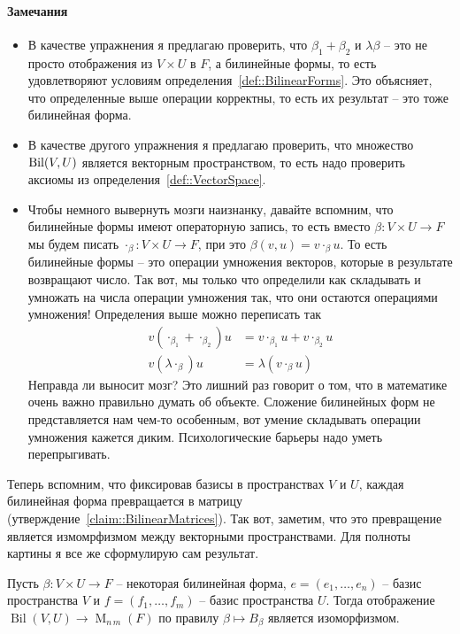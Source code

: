 \paragraph{Замечания}
\begin{itemize}
\item 
В качестве упражнения я предлагаю проверить, что $\beta_1 + \beta_2$ и $\lambda\beta$ -- это не просто отображения из $V\times U$ в $F$, а билинейные формы, то есть удовлетворяют условиям определения~\ref{def::BilinearForms}. Это объясняет, что определенные выше операции корректны, то есть их результат -- это тоже билинейная форма.

\item
В качестве другого упражнения я предлагаю проверить, что множество $\operatorname{Bil}(V, U)$ является векторным пространством, то есть надо проверить аксиомы из определения~\ref{def::VectorSpace}.

\item Чтобы немного вывернуть мозги наизнанку, давайте вспомним, что билинейные формы имеют операторную запись, то есть вместо $\beta\colon V\times U\to F$ мы будем писать $\cdot_\beta\colon V\times U \to F$, при это $\beta(v, u) = v \cdot_\beta u$. То есть билинейные формы -- это операции умножения векторов, которые в результате возвращают число. Так вот, мы только что определили как складывать и умножать на числа операции умножения так, что они остаются операциями умножения! Определения выше можно переписать так
\begin{align*}
v (\cdot_{\beta_1} + \cdot_{\beta_2}) u &= v \cdot_{\beta_1} u + v \cdot_{\beta_2} u\\
v(\lambda \cdot_\beta) u &= \lambda (v \cdot_\beta u)
\end{align*}
Неправда ли выносит мозг? Это лишний раз говорит о том, что в математике очень важно правильно думать об объекте. Сложение билинейных форм не представляется нам чем-то особенным, вот умение складывать операции умножения кажется диким. Психологические барьеры надо уметь перепрыгивать.
\end{itemize}

Теперь вспомним, что фиксировав базисы в пространствах $V$ и $U$, каждая билинейная форма превращается в матрицу (утверждение~\ref{claim::BilinearMatrices}). Так вот, заметим, что это превращение является измомрфизмом между векторными пространствами. Для полноты картины я все же сформулирую сам результат.

\begin{claim}%
Пусть $\beta\colon V\times U\to F$ -- некоторая билинейная форма,  $e = (e_1,\ldots,e_n)$ -- базис пространства $V$ и $f=(f_1,\ldots,f_m)$ -- базис пространства $U$. Тогда отображение $\operatorname{Bil}(V,U)\to \operatorname{M}_{n\,m}(F)$ по правилу $\beta\mapsto B_\beta$ является изоморфизмом.
\end{claim}

